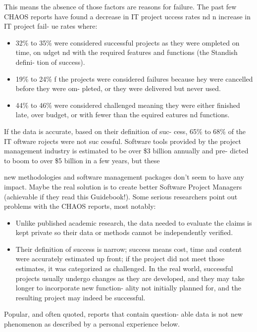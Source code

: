 \documentclass{book}
\begin{document}
\begin{multicols}{2}
This means the absence of those factors are reasons for
failure. The past few CHAOS reports have found a decrease
in IT project uccess rates nd n increase in IT project fail-
ue rates where:
\begin{itemize}
	\renewcommand{\labelitemi}{\scriptsize$\blacksquare$}
	\item 32\% to 35\% were considered successful projects as they
	were ompleted on time, on udget nd with the
	required features and functions (the Standish defini-
	tion of success).
	\item 19\% to 24\% f the projects were considered failures
	because hey were cancelled before they were om-
	pleted, or they were delivered but never used.
	\item 44\% to 46\% were considered challenged meaning they
	were either finished late, over budget, or with fewer
	than the equired eatures nd functions.
\end{itemize}

If the data is accurate, based on their definition of suc-
cess, 65\% to 68\% of the IT oftware rojects were not suc
cessful. Software tools provided by the project management
industry is estimated to be over \$3 billion annually and pre-
dicted to boom to over \$5 billion in a few years, but these

new methodologies and software management packages
don’t seem to have any impact. Maybe the real solution is to
create better Software Project Managers (achievable if they
read this Guidebook!). Some serious researchers point out
problems with the CHAOS reports, most notably:
\begin{itemize}
	\renewcommand{\labelitemi}{\scriptsize$\blacksquare$}
	\item Unlike published academic research, the data needed
	to evaluate the claims is kept private so their data or
	methods cannot be independently verified.
	\item Their definition of success is narrow; success means
	cost, time and content were accurately estimated up
	front; if the project did not meet those estimates, it was
	categorized as challenged. In the real world, successful
	projects usually undergo changes as they are developed,
	and they may take longer to incorporate new function-
	ality not initially planned for, and the resulting project
	may indeed be successful.
\end{itemize}

Popular, and often quoted, reports that contain question-
able data is not new phenomenon as described by a personal
experience below.


\end{multicols}
\end{document}
